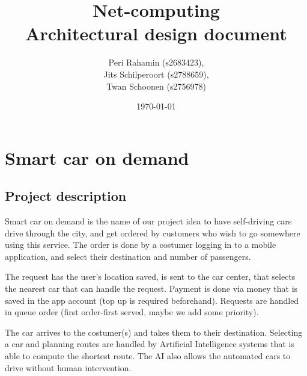 \documentclass[a4paper]{article}
\begin{document}
\title{Net-computing\\
Architectural design document
}

\date{\today}

\author{Peri Rahamin (s2683423),\\
Jits Schilperoort (s2788659),\\
Twan Schoonen (s2756978)
}




\maketitle
\section*{Smart car on demand}
\subsection*{Project description}
Smart car on demand is the name of our project idea to have self-driving cars drive through the city, and get ordered by customers who wish to go somewhere using this service. The order is done by a costumer logging in to a mobile application, and select their destination and number of passengers.

The request has the user's location saved, is sent to the car center, that selects the nearest car that can handle the request. Payment is done via money that is saved in the app account (top up is required beforehand). Requests are handled in queue order (first order-first served, maybe we add some priority).

The car arrives to the costumer(s) and takes them to their destination. Selecting a car and planning routes are handled by Artificial Intelligence systems that is able to compute the shortest route. The AI also allows the automated cars to drive without human intervention.
\end{document}
